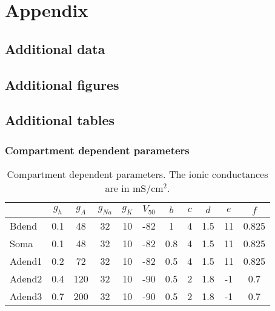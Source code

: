 \chapter{Appendix}\label{ch:appendix_b}

\section{Additional data}

\section{Additional figures}

\section{Additional tables}
\subsection{Compartment dependent parameters}
\begin{table}[htbp]
    \centering
    \caption[Compartment dependent parameters]{Compartment dependent parameters. The ionic conductances are in mS/cm\(^2\).}
    \begin{tabular}{l|cccccccccc}
        \hline
        \hline
               & \( g_{h} \) & \( g_{A} \) & \( g_{Na} \) & \( g_{K} \) & \( V_{50} \) & \( b \) & \( c \) & \( d \) & \( e \) & \( f \) \\
        \hline
        Bdend  & 0.1         & 48          & 32           & 10          & -82          & 1       & 4       & 1.5     & 11      & 0.825   \\
        Soma   & 0.1         & 48          & 32           & 10          & -82          & 0.8     & 4       & 1.5     & 11      & 0.825   \\
        Adend1 & 0.2         & 72          & 32           & 10          & -82          & 0.5     & 4       & 1.5     & 11      & 0.825   \\
        Adend2 & 0.4         & 120         & 32           & 10          & -90          & 0.5     & 2       & 1.8     & -1      & 0.7     \\
        Adend3 & 0.7         & 200         & 32           & 10          & -90          & 0.5     & 2       & 1.8     & -1      & 0.7     \\
        \hline
        \hline
    \end{tabular}
\end{table}\label{table:compartment_dependent_parameters}

